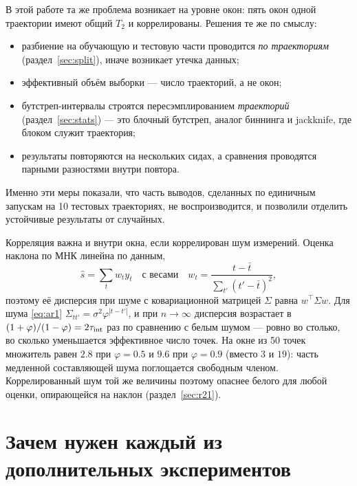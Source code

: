 \documentclass[12pt,a4paper]{report}
\numberwithin{equation}{chapter}
\begin{document}
В этой работе та же проблема возникает на уровне окон: пять окон одной
траектории имеют общий $T_2$ и коррелированы. Решения те же по смыслу:
\begin{itemize}
\item разбиение на обучающую и тестовую части проводится \emph{по
      траекториям} (раздел~\ref{sec:split}), иначе возникает утечка данных;
\item эффективный объём выборки --- число траекторий, а не окон;
\item бутстреп-интервалы строятся пересэмплированием \emph{траекторий}
      (раздел~\ref{sec:stats}) --- это блочный бутстреп, аналог биннинга и
      jackknife, где блоком служит траектория;
\item результаты повторяются на нескольких сидах, а сравнения проводятся
      парными разностями внутри повтора.
\end{itemize}
Именно эти меры показали, что часть выводов, сделанных по единичным
запускам на 10 тестовых траекториях, не воспроизводится, и позволили
отделить устойчивые результаты от случайных.

Корреляция важна и внутри окна, если коррелирован шум измерений. Оценка
наклона по МНК линейна по данным,
\[
\hat s=\sum_t w_t y_t\quad\text{с весами}\quad
w_t=\frac{t-\bar t}{\sum_{t'}(t'-\bar t)^2},
\]
поэтому её дисперсия при шуме с
ковариационной матрицей $\Sigma$ равна $w^{\top}\Sigma w$. Для шума
\eqref{eq:ar1} $\Sigma_{tt'}=\sigma^2\varphi^{|t-t'|}$, и при $n\to\infty$
дисперсия возрастает в $(1+\varphi)/(1-\varphi)=2\tau_{\rm int}$ раз по
сравнению с белым шумом --- ровно во столько, во сколько уменьшается
эффективное число точек. На окне из 50 точек множитель равен $2.8$ при
$\varphi=0.5$ и $9.6$ при $\varphi=0.9$ (вместо $3$ и $19$): часть медленной
составляющей шума поглощается свободным членом. Коррелированный шум той же
величины поэтому опаснее белого для любой оценки, опирающейся на наклон
(раздел~\ref{sec:r21}).

\section{Зачем нужен каждый из дополнительных экспериментов}
\end{document}
